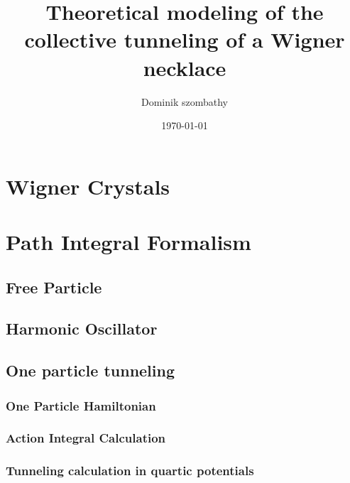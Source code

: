 

\title{Theoretical modeling of the collective tunneling of a Wigner necklace\\}
\author{Dominik szombathy}
\date{\today}



\maketitle

\begin{abstract}

\end{abstract}

\tableofcontents

\pagestyle{plain}

\section{Wigner Crystals}

\section{Path Integral Formalism}


	\subsection{Free Particle}
	\subsection{Harmonic Oscillator}
	\subsection{One particle tunneling}
		\subsubsection{One Particle Hamiltonian}
		\subsubsection{Action Integral Calculation}
		\subsubsection{Tunneling calculation in quartic potentials}

